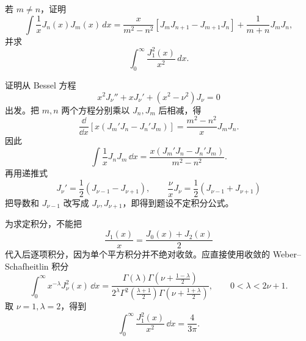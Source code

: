 \begin{question}
若 \(m\ne n\)，证明
\[
\int \frac1xJ_n(x)J_m(x)\,dx
=\frac{x}{m^2-n^2}\left[J_mJ_{n+1}-J_{m+1}J_n\right]
+\frac1{m+n}J_mJ_n,
\]
并求
\[
\int_0^\infty\frac{J_1^2(x)}{x^2}\,dx.
\]
\begin{solution}
证明从 Bessel 方程
\[
x^2J_\nu''+xJ_\nu'+(x^2-\nu^2)J_\nu=0
\]
出发。把 \(m,n\) 两个方程分别乘以 \(J_n,J_m\) 后相减，得
\[
\frac{\dd}{\dd{x}}\left[x(J_m'J_n-J_n'J_m)\right]
=\frac{m^2-n^2}{x}J_mJ_n.
\]
因此
\[
\int\frac1xJ_nJ_m\,\dd{x}
=\frac{x(J_m'J_n-J_n'J_m)}{m^2-n^2}.
\]
再用递推式
\[
J_\nu'=\frac12(J_{\nu-1}-J_{\nu+1}),\qquad
\frac{\nu}{x}J_\nu=\frac12(J_{\nu-1}+J_{\nu+1})
\]
把导数和 \(J_{\nu-1}\) 改写成 \(J_\nu,J_{\nu+1}\)，即得到题设不定积分公式。

为求定积分，不能把
\[
\frac{J_1(x)}x=\frac{J_0(x)+J_2(x)}2
\]
代入后逐项积分，因为单个平方积分并不绝对收敛。应直接使用收敛的 Weber--Schafheitlin 积分
\[
\int_0^\infty x^{-\lambda}J_\nu^2(x)\,\dd{x}
=\frac{\Gamma(\lambda)\Gamma\left(\nu+\frac{1-\lambda}{2}\right)}
{2^\lambda\Gamma^2\left(\frac{\lambda+1}{2}\right)
\Gamma\left(\nu+\frac{1+\lambda}{2}\right)},
\qquad 0<\lambda<2\nu+1.
\]
取 \(\nu=1,\lambda=2\)，得到
\[
\int_0^\infty\frac{J_1^2(x)}{x^2}\,\dd{x}=\frac{4}{3\pi}.
\]
\end{solution}
\end{question}

\setcounter{section}{10}

